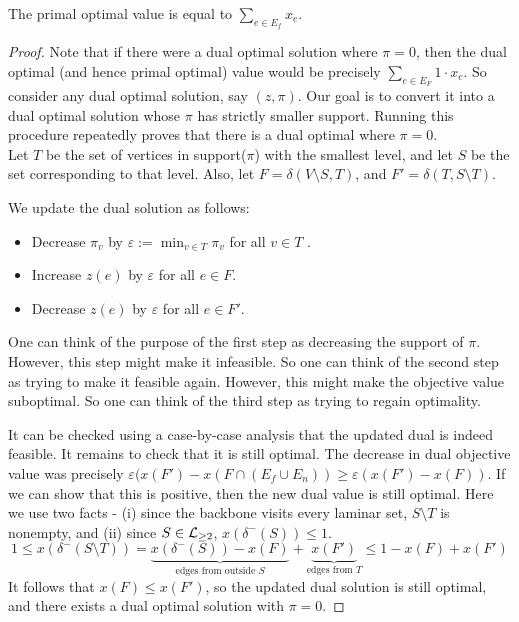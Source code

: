 \documentclass[./main.tex]{subfiles}
\newcommand{\level}{\textsf{\textup{level}}}
\begin{document}
	\vspace{2mm}
		\begin{claim}
			The primal optimal value is equal to $\sum_{e\in E_f}x_e$.
		\end{claim}
		\begin{proof}
			Note that if there were a dual optimal solution where $\pi = 0$, then the dual optimal (and hence primal optimal) value would be precisely $\sum_{e\in E_F}1\cdot x_e$.
			So consider any dual optimal solution, say $(z,\pi)$. Our goal is to convert it into a dual optimal solution whose $\pi$ has strictly smaller support.
			Running this procedure repeatedly proves that there is a dual optimal where $\pi = 0$.\vspace{2mm}\\
			Let $T$ be the set of vertices in support($\pi$) with the smallest \level, and let $S$ be the set corresponding to that \level.
			Also, let $F = \delta(V\setminus S, T)$, and $F' = \delta(T,S\setminus T)$.
			
			
			We update the dual solution as follows:
			\begin{itemize}[-]
				\item Decrease $\pi_v$ by $\varepsilon := \min_{v\in T} \pi_v$ for all $v\in T$ .

				\item Increase $z(e)$ by $\varepsilon$ for all $e\in F$.

				\item Decrease $z(e)$ by $\varepsilon$ for all $e\in F'$.
			\end{itemize}
			One can think of the purpose of the first step as decreasing the support of $\pi$. However, this step might make it infeasible. So one can think of the second step as trying to make it feasible again. However, this might make the objective value suboptimal. So one can think of the third step as trying to regain optimality.\vspace{2mm}

			It can be checked using a case-by-case analysis that the updated dual is indeed feasible.	It remains to check that it is still optimal.
			The decrease in dual objective value was precisely $\varepsilon (x(F') - x(F\cap( E_f\cup E_n))\geqslant \varepsilon(x(F') - x(F))$.
			If we can show that this is positive, then the new dual value is still optimal. Here we use two facts - (i) since the backbone visits every laminar set, $S\setminus T$ is nonempty, and (ii) since $S\in \mathcal{L}_{\geq 2}$, $x(\delta^-(S))\leqslant 1$.
			\[
				1\leqslant x(\delta^-(S\setminus T)) = \underbrace{x(\delta^-(S)) - x(F)}_{\text{edges from outside } S} + \underbrace{x(F')}_{\text{edges from } T}\leqslant 1 - x(F) + x(F')
			\]
			It follows that $x(F)\leqslant x(F')$, so the updated dual solution is still optimal, and there exists a dual optimal solution with $\pi = 0$.
		\end{proof}
\end{document}
